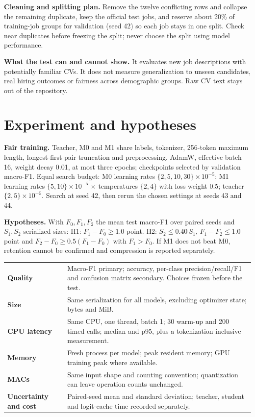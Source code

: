 \documentclass[10pt,a4paper]{article}
\begin{document}
\textbf{Cleaning and splitting plan.} Remove the twelve conflicting rows and collapse the remaining duplicate, keep the official test jobs, and reserve about 20\% of training-job groups for validation (seed 42) so each job stays in one split. Check near duplicates before freezing the split; never choose the split using model performance.

\textbf{What the test can and cannot show.} It evaluates new job descriptions with potentially familiar CVs. It does not measure generalization to unseen candidates, real hiring outcomes or fairness across demographic groups. Raw CV text stays out of the repository.

\section{Experiment and hypotheses}
\textbf{Fair training.} Teacher, M0 and M1 share labels, tokenizer, 256-token maximum length, longest-first pair truncation and preprocessing. AdamW, effective batch 16, weight decay 0.01, at most three epochs; checkpoints selected by validation macro-F1. Equal search budget: M0 learning rates $\{2,5,10,30\}\times10^{-5}$; M1 learning rates $\{5,10\}\times10^{-5}$ $\times$ temperatures $\{2,4\}$ with loss weight 0.5; teacher $\{2,5\}\times10^{-5}$. Search at seed 42, then rerun the chosen settings at seeds 43 and 44.

\textbf{Hypotheses.} With $F_0,F_1,F_2$ the mean test macro-F1 over paired seeds and $S_1,S_2$ serialized sizes:
H1: $F_1-F_0\ge 1.0$ point. H2: $S_2\le0.40\,S_1$, $F_1-F_2\le1.0$ point and $F_2-F_0\ge0.5(F_1-F_0)$ with $F_1>F_0$. If M1 does not beat M0, retention cannot be confirmed and compression is reported separately.

\begin{tabularx}{\linewidth}{@{}>{\bfseries}p{3.4cm}L@{}}\toprule
Quality & Macro-F1 primary; accuracy, per-class precision/recall/F1 and confusion matrix secondary. Choices frozen before the test.\\
Size & Same serialization for all models, excluding optimizer state; bytes and MiB.\\
CPU latency & Same CPU, one thread, batch 1; 30 warm-up and 200 timed calls; median and p95, plus a tokenization-inclusive measurement.\\
Memory & Fresh process per model; peak resident memory; GPU training peak where available.\\
MACs & Same input shape and counting convention; quantization can leave operation counts unchanged.\\
Uncertainty and cost & Paired-seed mean and standard deviation; teacher, student and logit-cache time recorded separately.\\\bottomrule
\end{tabularx}
\end{document}
